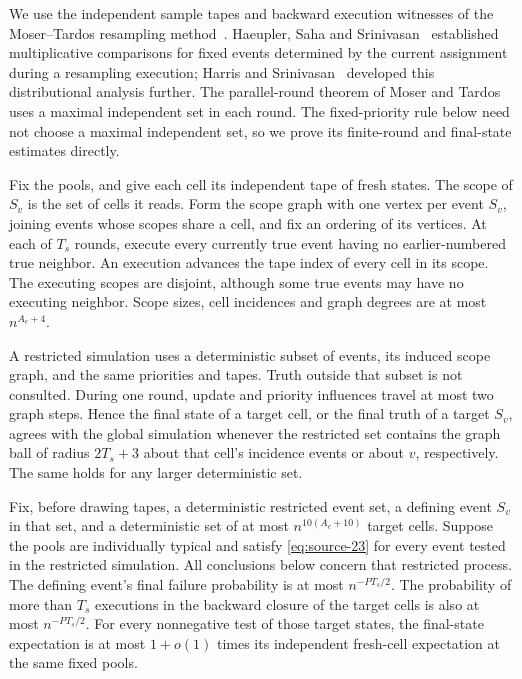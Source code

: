 We use the independent sample tapes and backward execution witnesses of
the Moser--Tardos resampling method~\cite{moser-tardos2010}.
Haeupler, Saha and Srinivasan~\cite[Theorem~2.2]{haeupler-saha-srinivasan2011}
established multiplicative comparisons for fixed events determined by the
current assignment during a resampling execution; Harris and
Srinivasan~\cite{harris-srinivasan2017} developed this distributional
analysis further. The parallel-round theorem of Moser and Tardos uses a
maximal independent set in each round. The fixed-priority rule below need
not choose a maximal independent set, so we prove its finite-round and
final-state estimates directly.

Fix the pools, and give each cell its independent tape of fresh states.
The scope of \(S_v\) is the set of cells it reads. Form the scope graph
with one vertex per event \(S_v\), joining events whose scopes share a
cell, and fix an ordering of its vertices. At each of \(T_s\) rounds,
execute every currently true event having no earlier-numbered true
neighbor. An execution advances the tape index of every cell in its scope.
The executing scopes are disjoint, although some true events may have no
executing neighbor. Scope sizes, cell incidences and graph degrees are at
most \(n^{A_c+4}\).

A restricted simulation uses a deterministic subset of events, its induced
scope graph, and the same priorities and tapes. Truth outside that subset
is not consulted. During one round, update and priority influences travel
at most two graph steps. Hence the final state of a target cell, or the
final truth of a target \(S_v\), agrees with the global simulation whenever
the restricted set contains the graph ball of radius \(2T_s+3\) about
that cell's incidence events or about \(v\), respectively. The same
holds for any larger deterministic set.

\begin{proposition}\label{prop:initial-resampling-comparison}
Fix, before drawing tapes, a deterministic restricted event set, a defining
event \(S_v\) in that set, and a deterministic set of at most
\(n^{10(A_c+10)}\) target cells. Suppose the pools are individually
typical and satisfy \eqref{eq:source-23} for every event tested in the
restricted simulation. All conclusions below concern that restricted
process. The defining event's final failure probability is at most
\(n^{-PT_s/2}\). The probability of more than \(T_s\) executions in the
backward closure of the target cells is also at most \(n^{-PT_s/2}\).
For every nonnegative test of those target states, the final-state
expectation is at most \(1+o(1)\) times its independent fresh-cell
expectation at the same fixed pools.
\end{proposition}

